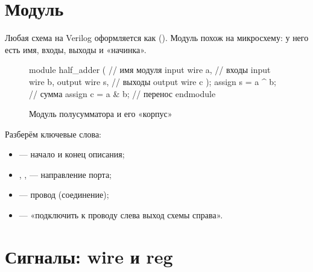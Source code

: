 \section{Модуль}

Любая схема на Verilog оформляется как  (). Модуль
похож на микросхему: у него есть имя, входы, выходы и «начинка».

\begin{figure}[H]
\centering
\begin{minipage}{0.52\textwidth}
\begin{vcode}
module half_adder (   // имя модуля
    input  wire a,    // входы
    input  wire b,
    output wire s,    // выходы
    output wire c
);
    assign s = a ^ b; // сумма
    assign c = a & b; // перенос
endmodule
\end{vcode}
\end{minipage}\hfill
\begin{minipage}{0.44\textwidth}
\centering
{}
\end{minipage}
\caption{Модуль полусумматора и его «корпус»}
\end{figure}

Разберём ключевые слова:
\begin{itemize}
  \item {} --- начало и конец описания;
  \item {}, ,  --- направление порта;
  \item {} --- провод (соединение);
  \item {} --- «подключить к проводу слева выход схемы справа».
\end{itemize}

\section{Сигналы: wire и reg}

